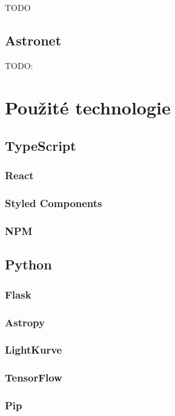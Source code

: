 \documentclass[a4paper,12pt]{article}
\begin{document}
{{{{{{TODO

\subsection{Astronet}

TODO: \cite{kepler80}

\section{Použité technologie}

\subsection{TypeScript}

\subsubsection{React}

\subsubsection{Styled Components}

\subsubsection{NPM}

\subsection{Python}

\subsubsection{Flask}

\subsubsection{Astropy}

\subsubsection{LightKurve}

\subsubsection{TensorFlow}

\subsubsection{Pip}

}}}}}}
\end{document}
